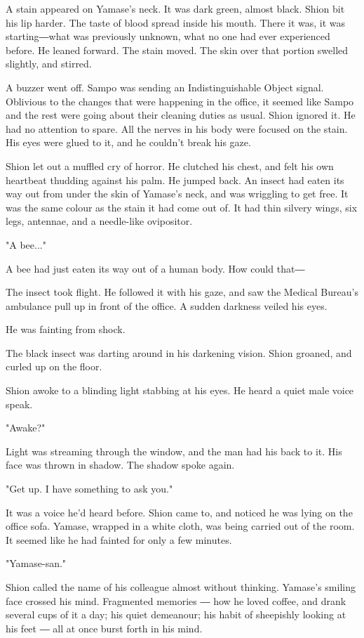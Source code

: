 A stain appeared on Yamase's neck. It was dark green, almost black.
Shion bit his lip harder. The taste of blood spread inside his mouth.
There it was, it was starting―what was previously unknown, what no one
had ever experienced before. He leaned forward. The stain moved. The
skin over that portion swelled slightly, and stirred.

A buzzer went off. Sampo was sending an Indistinguishable Object signal.
Oblivious to the changes that were happening in the office, it seemed
like Sampo and the rest were going about their cleaning duties as usual.
Shion ignored it. He had no attention to spare. All the nerves in his
body were focused on the stain. His eyes were glued to it, and he
couldn't break his gaze.

Shion let out a muffled cry of horror. He clutched his chest, and felt
his own heartbeat thudding against his palm. He jumped back. An insect
had eaten its way out from under the skin of Yamase's neck, and was
wriggling to get free. It was the same colour as the stain it had come
out of. It had thin silvery wings, six legs, antennae, and a needle-like
ovipositor.

"A bee..."

A bee had just eaten its way out of a human body. How could that―

The insect took flight. He followed it with his gaze, and saw the
Medical Bureau's ambulance pull up in front of the office. A sudden
darkness veiled his eyes.

He was fainting from shock.

The black insect was darting around in his darkening vision. Shion
groaned, and curled up on the floor.

\myspace

Shion awoke to a blinding light stabbing at his eyes. He heard a quiet
male voice speak.

"Awake?"

Light was streaming through the window, and the man had his back to it.
His face was thrown in shadow. The shadow spoke again.

"Get up. I have something to ask you."

It was a voice he'd heard before. Shion came to, and noticed he was
lying on the office sofa. Yamase, wrapped in a white cloth, was being
carried out of the room. It seemed like he had fainted for only a few
minutes.

"Yamase-san."

Shion called the name of his colleague almost without thinking. Yamase's
smiling face crossed his mind. Fragmented memories ― how he loved
coffee, and drank several cups of it a day; his quiet demeanour; his
habit of sheepishly looking at his feet ― all at once burst forth in his
mind.

